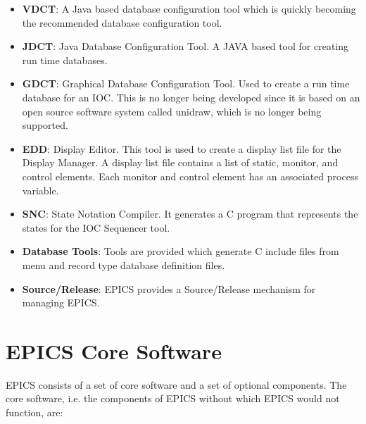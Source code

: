 \begin{itemize}
\item \textbf{VDCT}: A Java based database configuration tool which is quickly becoming the recommended database 
configuration tool.

\item \textbf{JDCT}: Java Database Configuration Tool. A JAVA based tool for creating run time databases.

\item \textbf{GDCT}: Graphical Database Configuration Tool. Used to create a run time database for an IOC. This is no longer 
being developed since it is based on an open source software system called unidraw, which is no longer being 
supported.

\item \textbf{EDD}:  Display Editor. This tool is used to create a display list file for the Display Manager. A display list file 
contains a list of static, monitor, and control elements. Each monitor and control element has an associated process 
variable.

\item \textbf{SNC}:  State Notation Compiler. It generates a C program that represents the states for the IOC Sequencer tool.

\item \textbf{Database Tools}: Tools are provided which generate C include files from menu and record type database definition 
files.

\item \textbf{Source/Release}:  EPICS provides a Source/Release mechanism for managing EPICS.

\end{itemize}\section{EPICS Core Software}

EPICS consists of a set of core software and a set of optional components. The core software, i.e. the components of 
EPICS without which EPICS would not function, are:


